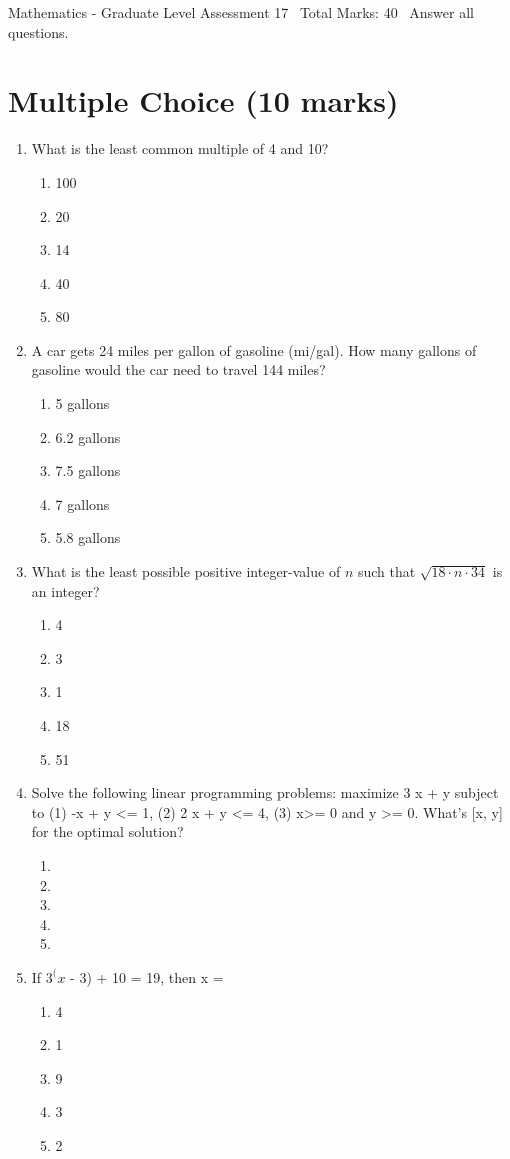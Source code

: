 \documentclass[12pt]{article}
\begin{document}
\begin{center}
Mathematics - Graduate Level Assessment 17 \
Total Marks: 40 \
Answer all questions.
\end{center}

\section*{Multiple Choice (10 marks)}
\begin{enumerate}[label=\arabic*.]
\item What is the least common multiple of 4 and 10?
\begin{enumerate}[label=(\alph*)]
    \item 100
    \item 20
    \item 14
    \item 40
    \item 80
\end{enumerate}
\item A car gets 24 miles per gallon of gasoline (mi/gal). How many gallons of gasoline would the car need to travel 144 miles?
\begin{enumerate}[label=(\alph*)]
    \item 5 gallons
    \item 6.2 gallons
    \item 7.5 gallons
    \item 7 gallons
    \item 5.8 gallons
\end{enumerate}
\item What is the least possible positive integer-value of $n$ such that $\sqrt{18\cdot n \cdot 34}$ is an integer?
\begin{enumerate}[label=(\alph*)]
    \item 4
    \item 3
    \item 1
    \item 18
    \item 51
\end{enumerate}
\item Solve the following linear programming problems: maximize 3 x + y subject to (1) -x + y \textless{}= 1, (2) 2 x + y \textless{}= 4, (3) x\textgreater{}= 0 and y \textgreater{}= 0. What's [x, y] for the optimal solution?
\begin{enumerate}[label=(\alph*)]
    \item [1, 2]
    \item [0, 1]
    \item [1, 1]
    \item [4, 0]
    \item [3, 0]
\end{enumerate}
\item If $3^(x$ - 3) + 10 = 19, then x =
\begin{enumerate}[label=(\alph*)]
    \item 4
    \item 1
    \item 9
    \item 3
    \item 2
\end{enumerate}
\end{enumerate}
\end{document}
